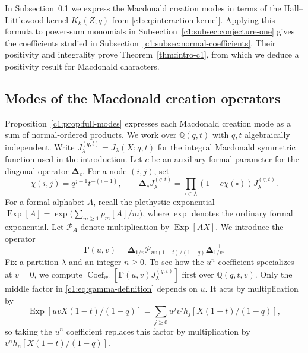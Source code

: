 \documentclass[12pt,reqno,a4paper]{amsart}
\numberwithin{equation}{section}
\numberwithin{figure}{section}
\theoremstyle{plain}
\theoremstyle{definition}
\DeclareMathOperator{\Coef}{Coef}
\begin{document}
In Subsection~\ref{c1:subsec:macdonald-modes} we express the Macdonald
creation modes in terms of the Hall--Littlewood kernel $K_k(Z;q)$
from \eqref{c1:eq:interaction-kernel}.
Applying this formula to power-sum monomials in
Subsection~\ref{c1:subsec:conjecture-one} gives the coefficients
studied in Subsection~\ref{c1:subsec:normal-coefficients}.
Their positivity and integrality prove Theorem~\ref{thm:intro-c1},
from which we deduce a positivity result for Macdonald characters.

\subsection{Modes of the Macdonald creation operators}
\label{c1:subsec:macdonald-modes}

Proposition~\ref{c1:prop:full-modes} expresses each Macdonald creation
mode as a sum of normal-ordered products.  We work over $\mathbb Q(q,t)$
with $q,t$ algebraically independent.
Write $J_\lambda^{(q,t)}=J_\lambda(X;q,t)$ for the integral Macdonald
symmetric function used in the introduction.  Let $c$ be an auxiliary
formal parameter for the diagonal operator $\boldsymbol\Delta_c$.
For a node $(i,j)$, set
\[
 \chi(i,j)=q^{j-1}t^{-(i-1)},\qquad
 \boldsymbol\Delta_c J_\lambda^{(q,t)}
 =\prod_{\square\in\lambda}(1-c\chi(\square))J_\lambda^{(q,t)}.
\]
For a formal alphabet $A$, recall the plethystic exponential
$\operatorname{Exp}[A]=\exp\bigl(\sum_{m\geq1}p_m[A]/m\bigr)$,
where $\exp$ denotes the ordinary formal exponential.
Let $\mathcal P_A$ denote multiplication by $\operatorname{Exp}[AX]$.
We introduce the operator
\begin{equation}\label{c1:eq:gamma-definition}
 \boldsymbol\Gamma(u,v)
 =\boldsymbol\Delta_{1/v}
   \mathcal P_{uv(1-t)/(1-q)}
   \boldsymbol\Delta_{1/v}^{-1}.
\end{equation}
Fix a partition $\lambda$ and an integer $n\geq0$.  To see how the
$u^n$ coefficient specializes at $v=0$, we compute
$\Coef_{u^n}[\boldsymbol\Gamma(u,v)J_\lambda^{(q,t)}]$ first over
$\mathbb Q(q,t,v)$.  Only the middle factor in
\eqref{c1:eq:gamma-definition} depends on $u$.  It acts by multiplication by
\[
 \operatorname{Exp}[uvX(1-t)/(1-q)]
 =\sum_{j\geq0}u^jv^j h_j[X(1-t)/(1-q)],
\]
so taking the $u^n$ coefficient replaces this factor by multiplication
by $v^n h_n[X(1-t)/(1-q)]$.
\end{document}
